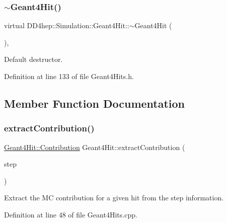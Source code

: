 \subsubsection{\texorpdfstring{$\sim$\+Geant4\+Hit()}{~Geant4Hit()}}
{\footnotesize\ttfamily virtual D\+D4hep\+::\+Simulation\+::\+Geant4\+Hit\+::$\sim$\+Geant4\+Hit (\begin{DoxyParamCaption}{ }\end{DoxyParamCaption})\hspace{0.3cm}{\ttfamily [inline]}, {\ttfamily [virtual]}}



Default destructor. 



Definition at line 133 of file Geant4\+Hits.\+h.



\subsection{Member Function Documentation}
\hypertarget{class_d_d4hep_1_1_simulation_1_1_geant4_hit_a9ff079cd95ab9c22abca994fcdc31d97}{}\label{class_d_d4hep_1_1_simulation_1_1_geant4_hit_a9ff079cd95ab9c22abca994fcdc31d97} 
\subsubsection{\texorpdfstring{extract\+Contribution()}{extractContribution()}}
{\footnotesize\ttfamily \hyperlink{class_d_d4hep_1_1_simulation_1_1_geant4_hit_a03a5270c4d1410302fe278ce6a47f268}{Geant4\+Hit\+::\+Contribution} Geant4\+Hit\+::extract\+Contribution (\begin{DoxyParamCaption}\item[{G4\+Step $\ast$}]{step }\end{DoxyParamCaption})\hspace{0.3cm}{\ttfamily [static]}}



Extract the MC contribution for a given hit from the step information. 



Definition at line 48 of file Geant4\+Hits.\+cpp.

\hypertarget{class_d_d4hep_1_1_simulation_1_1_geant4_hit_a4849a8685e28342d97aff6166a2f348d}{}\label{class_d_d4hep_1_1_simulation_1_1_geant4_hit_a4849a8685e28342d97aff6166a2f348d} 
